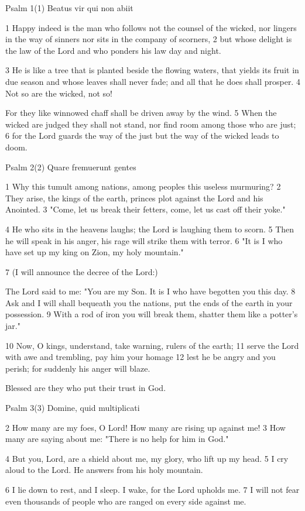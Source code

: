 Psalm 1(1) Beatus vir qui non abiit

1 Happy indeed is the man
who follows not the counsel of the wicked,
nor lingers in the way of sinners
nor sits in the company of scorners,
2 but whose delight is the law of the Lord
and who ponders his law day and night.

3 He is like a tree that is planted
beside the flowing waters,
that yields its fruit in due season
and whose leaves shall never fade;
and all that he does shall prosper.
4 Not so are the wicked, not so!

For they like winnowed chaff
shall be driven away by the wind.
5 When the wicked are judged they shall not stand,
nor find room among those who are just;
6 for the Lord guards the way of the just
but the way of the wicked leads to doom.

Psalm 2(2) Quare fremuerunt gentes

1 Why this tumult among nations,
among peoples this useless murmuring?
2 They arise, the kings of the earth,
princes plot against the Lord and his Anointed.
3 "Come, let us break their fetters,
come, let us cast off their yoke."

4 He who sits in the heavens laughs;
the Lord is laughing them to scorn.
5 Then he will speak in his anger,
his rage will strike them with terror.
6 "It is I who have set up my king on Zion,
my holy mountain."

7 (I will announce the decree of the Lord:)

The Lord said to me: "You are my Son.
It is I who have begotten you this day.
8 Ask and I will shall bequeath you the nations,
put the ends of the earth in your possession.
9 With a rod of iron you will break them,
shatter them like a potter's jar."

10 Now, O kings, understand,
take warning, rulers of the earth;
11 serve the Lord with awe
and trembling, pay him your homage
12 lest he be angry and you perish;
for suddenly his anger will blaze.

Blessed are they who put their trust in God.


Psalm 3(3) Domine, quid multiplicati

2 How many are my foes, O Lord!
How many are rising up against me!
3 How many are saying about me:
"There is no help for him in God."

4 But you, Lord, are a shield about me,
my glory, who lift up my head.
5 I cry aloud to the Lord.
He answers from his holy mountain.

6 I lie down to rest, and I sleep.
I wake, for the Lord upholds me.
7 I will not fear even thousands of people
who are ranged on every side against me.

